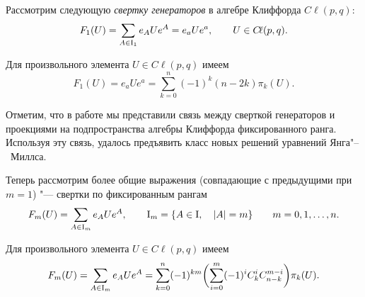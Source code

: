 \smallskip

\hypertarget{shir:par2}{}
Рассмотрим следующую {\it свертку генераторов}\cite{shir:Marchuk:Shirokov} в алгебре Клиффорда ${{C}\!\ell}(p,q)$:
$$F_1(U)=\sum_{A\in {\rm I}_ 1} e_A U e^A=e_a U e^a,\qquad U\in{{C}\!\ell}(p,q).$$

\smallskip

\hypertarget{shirokov:theoremSvGen}{}
\begin{theorem}Для произвольного элемента $U\in{{C}\!\ell}(p,q)$ имеем
$$F_1(U)=e_a U e^a=\sum_{k=0}^n (-1)^k (n-2k)\pi_k(U).$$
\end{theorem}

\smallskip

Отметим, что в работе \cite{shir:YM} мы представили связь между сверткой генераторов и проекциями на подпространства алгебры Клиффорда фиксированного ранга. 
Используя эту связь, удалось предъявить класс новых решений уравнений Янга"--~Миллса.

%

Теперь рассмотрим более общие выражения (совпадающие с предыдущими при $m=1$) "--- свертки по фиксированным рангам
$$F_m(U)=\sum_{A\in{\rm I}_ m}e_A U e^A,\qquad {\rm I}_ {m}=\{A\in{\rm I},\quad |A|=m\}\qquad m=0, 1, \ldots ,n.$$

\smallskip
\hypertarget{shirokov:theoremSvBas}{}
\begin{theorem}[2]Для произвольного элемента $U\in{{C}\!\ell}(p,q)$ имеем
\begin{gather}
F_m(U)=\sum_{A\in{\rm I}_ m}e_A U e^A=\sum_{k=0}^n(-1)^{km}\biggl(\sum_{i=0}^{m}(-1)^iC_k^i C_{n-k}^{m-i}\biggr)\pi_k(U).\label{shirokov:svert}
\end{gather}
\end{theorem}

